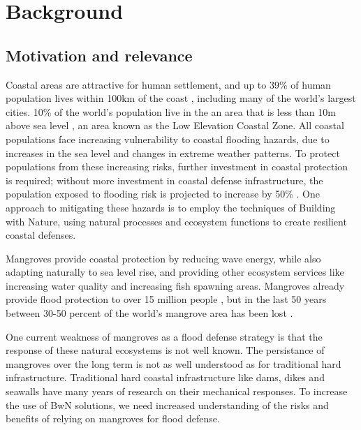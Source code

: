 \chapter{Background}


\section{Motivation and relevance}

Coastal areas are attractive for human settlement, and up to 39\% of human population lives within 100km of the coast \parencite{Magdalena2021}, including many of the world's largest cities. 10\% of the world's population live in the an area that is less than 10m above sea level \parencite{Neumann2015,Lichter2011}, an area known as the Low Elevation Coastal Zone. All coastal populations face increasing vulnerability to coastal flooding hazards, due to increases in the sea level and changes in extreme weather patterns. To protect populations from these increasing risks, further investment in coastal protection is required; without more investment in coastal defense infrastructure, the population exposed to flooding risk is projected to increase by 50\% \Parencite{Kirezci2020}. One approach to mitigating these hazards is to employ the techniques of Building with Nature, using natural processes and ecosystem functions to create resilient coastal defenses. 

Mangroves provide coastal protection by reducing wave energy, while also adapting naturally to sea level rise, and providing other ecosystem services like increasing water quality and increasing fish spawning areas. Mangroves already provide flood protection to over 15 million people \parencite{Menendez2020}, but in the last 50 years between 30-50 percent of the world's mangrove area has been lost \parencite{Goldberg2020}.

One current weakness of mangroves as a flood defense strategy is that the response of these natural ecosystems is not well known. The persistance of mangroves over the long term is not as well understood as for traditional hard infrastructure. Traditional hard coastal infrastructure like dams, dikes and seawalls have many years of research on their mechanical responses. To increase the use of BwN solutions, we need increased understanding of the risks and benefits of relying on mangroves for flood defense.

